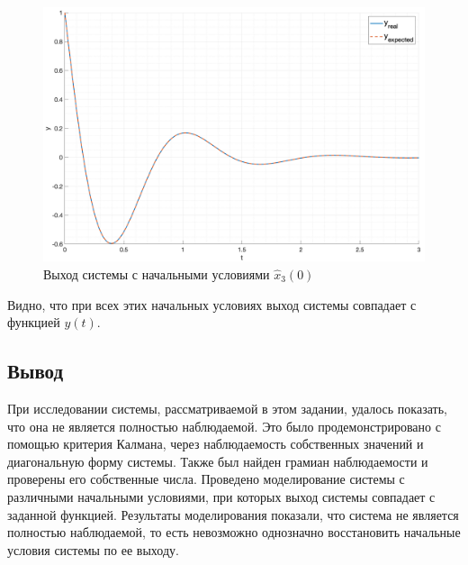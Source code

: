 \begin{figure}[ht!]
    \centering
    \includegraphics[width=\textwidth]{media/plots/task4_output_hat_3.png}
    \caption{Выход системы с начальными условиями $\hat{x}_3(0)$}
    \label{fig:task4_output__hat_3}
\end{figure}

Видно, что при всех этих начальных условиях выход системы совпадает с функцией $y(t)$.

\subsection{Вывод}
При исследовании системы, рассматриваемой в этом задании, удалось показать, что она не является полностью наблюдаемой.
Это было продемонстрировано с помощью критерия Калмана, через наблюдаемость собственных значений и диагональную форму системы. 
Также был найден грамиан наблюдаемости и проверены его собственные числа. 
Проведено моделирование системы с различными начальными условиями, при которых выход системы совпадает с заданной функцией. 
Результаты моделирования показали, что система не является полностью наблюдаемой, то есть 
невозможно однозначно восстановить начальные условия системы по ее выходу.